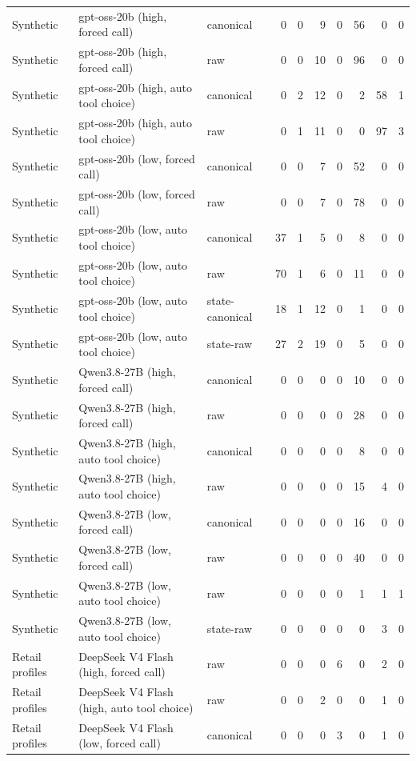 \begin{table}[htbp]
{\begin{tabular}{lllrrrrrrr}
Synthetic & gpt-oss-20b (high, forced call) & canonical & 0 & 0 & 9 & 0 & 56 & 0 & 0 \\
Synthetic & gpt-oss-20b (high, forced call) & raw & 0 & 0 & 10 & 0 & 96 & 0 & 0 \\
Synthetic & gpt-oss-20b (high, auto tool choice) & canonical & 0 & 2 & 12 & 0 & 2 & 58 & 1 \\
Synthetic & gpt-oss-20b (high, auto tool choice) & raw & 0 & 1 & 11 & 0 & 0 & 97 & 3 \\
Synthetic & gpt-oss-20b (low, forced call) & canonical & 0 & 0 & 7 & 0 & 52 & 0 & 0 \\
Synthetic & gpt-oss-20b (low, forced call) & raw & 0 & 0 & 7 & 0 & 78 & 0 & 0 \\
Synthetic & gpt-oss-20b (low, auto tool choice) & canonical & 37 & 1 & 5 & 0 & 8 & 0 & 0 \\
Synthetic & gpt-oss-20b (low, auto tool choice) & raw & 70 & 1 & 6 & 0 & 11 & 0 & 0 \\
Synthetic & gpt-oss-20b (low, auto tool choice) & state-canonical & 18 & 1 & 12 & 0 & 1 & 0 & 0 \\
Synthetic & gpt-oss-20b (low, auto tool choice) & state-raw & 27 & 2 & 19 & 0 & 5 & 0 & 0 \\
Synthetic & Qwen3.8-27B (high, forced call) & canonical & 0 & 0 & 0 & 0 & 10 & 0 & 0 \\
Synthetic & Qwen3.8-27B (high, forced call) & raw & 0 & 0 & 0 & 0 & 28 & 0 & 0 \\
Synthetic & Qwen3.8-27B (high, auto tool choice) & canonical & 0 & 0 & 0 & 0 & 8 & 0 & 0 \\
Synthetic & Qwen3.8-27B (high, auto tool choice) & raw & 0 & 0 & 0 & 0 & 15 & 4 & 0 \\
Synthetic & Qwen3.8-27B (low, forced call) & canonical & 0 & 0 & 0 & 0 & 16 & 0 & 0 \\
Synthetic & Qwen3.8-27B (low, forced call) & raw & 0 & 0 & 0 & 0 & 40 & 0 & 0 \\
Synthetic & Qwen3.8-27B (low, auto tool choice) & raw & 0 & 0 & 0 & 0 & 1 & 1 & 1 \\
Synthetic & Qwen3.8-27B (low, auto tool choice) & state-raw & 0 & 0 & 0 & 0 & 0 & 3 & 0 \\
Retail profiles & DeepSeek V4 Flash (high, forced call) & raw & 0 & 0 & 0 & 6 & 0 & 2 & 0 \\
Retail profiles & DeepSeek V4 Flash (high, auto tool choice) & raw & 0 & 0 & 2 & 0 & 0 & 1 & 0 \\
Retail profiles & DeepSeek V4 Flash (low, forced call) & canonical & 0 & 0 & 0 & 3 & 0 & 1 & 0 \\

\end{tabular}}
\end{table}
